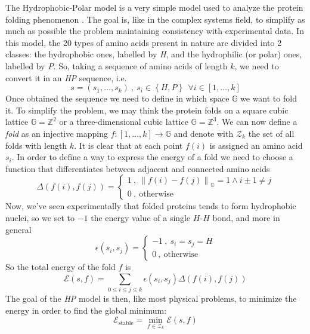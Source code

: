 The Hydrophobic-Polar model is a very simple model used to analyze the protein folding phenomenon \cite{PERM}.
The goal is, like in the complex systems field, to simplify as much as possible the problem maintaining consistency with experimental data.
In this model, the 20 types of amino acids present in nature are divided into 2 classes: the hydrophobic ones, labelled by \emph{H}, and the hydrophilic (or polar) ones, labelled by \emph{P}.
So, taking a sequence of amino acids of length $k$, we need to convert it in an \emph{HP} sequence, i.e.
\begin{equation*}
    s = \left(s_1, \ldots, s_k\right) \ , \ s_i \in \left\{H, P\right\} \ \ \forall i \in \left[1,\ldots,k\right]
\end{equation*}
Once obtained the sequence we need to define in which space $\mathbb{G}$ we want to fold it.
To simplify the problem, we may think the protein folds on a square cubic lattice $\mathbb{G} = \mathbb{Z}^2$ or a three-dimensional cubic lattice $\mathbb{G} = \mathbb{Z}^3$.
We can now define a \emph{fold} as an injective mapping $f : \left[1,\ldots,k\right] \to \mathbb{G}$ and denote with $\mathcal{Z}_k$ the set of all folds with length $k$.
It is clear that at each point $f(i)$ is assigned an amino acid $s_i$.
In order to define a way to express the energy of a fold we need to choose a function that differentiates between adjacent and connected amino acids
\begin{equation*}
    \Delta\left(f(i),f(j)\right) =
    \begin{cases}
        1 \ , \ {\left\lVert f(i) - f(j) \right\rVert}_\mathbb{G} = 1 \land i \pm 1 \neq j\\
        0 \ , \ \text{otherwise}
    \end{cases}
\end{equation*}
Now, we've seen experimentally that folded proteins tends to form hydrophobic nuclei, so we set to $-1$ the energy value of a single $H$-$H$ bond, and more in general
\begin{equation*}
    \epsilon\left(s_i,s_j\right) =
    \begin{cases}
        -1 \ , \ s_i = s_j = H\\
        0 \ , \ \text{otherwise}
    \end{cases}
\end{equation*}
So the total energy of the fold $f$ is
\begin{equation*}
    \mathcal{E}(s,f) = \sum_{0 \leq i \leq j \leq k} \epsilon\left(s_i,s_j\right)\Delta\left(f(i),f(j)\right)
\end{equation*}
The goal of the \emph{HP} model is then, like most physical problems, to minimize the energy in order to find the global minimum:
\begin{equation*}
    \mathcal{E}_\text{stable} = \min_{f \in \mathcal{Z}_k} \mathcal{E}(s,f)
\end{equation*}
